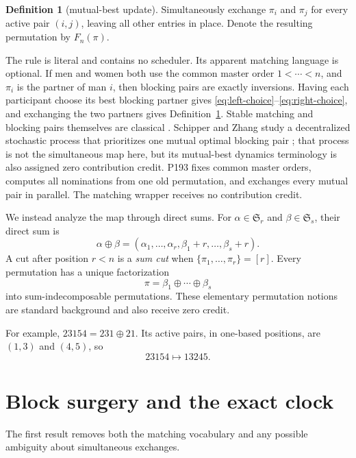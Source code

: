 \documentclass[a4paper,10pt]{amsart}
\theoremstyle{definition}
\newtheorem{definition}[theorem]{Definition}
\theoremstyle{remark}
\begin{document}
\begin{definition}[mutual-best update]\label{def:map}
Simultaneously exchange $\pi_i$ and $\pi_j$ for every active pair $(i,j)$,
leaving all other entries in place.  Denote the resulting permutation by
$F_n(\pi)$.
\end{definition}

The rule is literal and contains no scheduler.  Its apparent matching
language is optional.  If men and women both use the common master order
$1<\cdots<n$, and $\pi_i$ is the partner of man $i$, then blocking pairs are
exactly inversions.  Having each participant choose its best blocking
partner gives \eqref{eq:left-choice}--\eqref{eq:right-choice}, and exchanging
the two partners gives Definition~\ref{def:map}.  Stable matching and
blocking pairs themselves are classical \cite{GaleShapley1962}.  Schipper
and Zhang study a decentralized stochastic process that prioritizes one
mutual optimal blocking pair \cite{SchipperZhang2025}; that process is not
the simultaneous map here, but its mutual-best dynamics terminology is also
assigned zero contribution credit.  P193 fixes common master orders, computes
all nominations from one old permutation, and exchanges every mutual pair in
parallel.  The matching wrapper receives no contribution credit.

We instead analyze the map through direct sums.  For $\alpha\in\mathfrak
S_r$ and $\beta\in\mathfrak S_s$, their direct sum is
\[
 \alpha\oplus\beta=
 (\alpha_1,\ldots,\alpha_r,\beta_1+r,\ldots,\beta_s+r).
\]
A cut after position $r<n$ is a \emph{sum cut} when
$\{\pi_1,\ldots,\pi_r\}=[r]$.  Every permutation has a unique factorization
\begin{equation}\label{eq:sum-factorization}
             \pi=\beta_1\oplus\cdots\oplus\beta_s
\end{equation}
into sum-indecomposable permutations.  These elementary permutation notions
are standard background \cite{Bona2012,Stanley2011EC1} and also receive zero
credit.

For example, $23154=231\oplus21$.  Its active pairs, in one-based positions,
are $(1,3)$ and $(4,5)$, so
\[
                  23154\longmapsto13245.
\]

\section{Block surgery and the exact clock}

The first result removes both the matching vocabulary and any possible
ambiguity about simultaneous exchanges.
\end{document}
